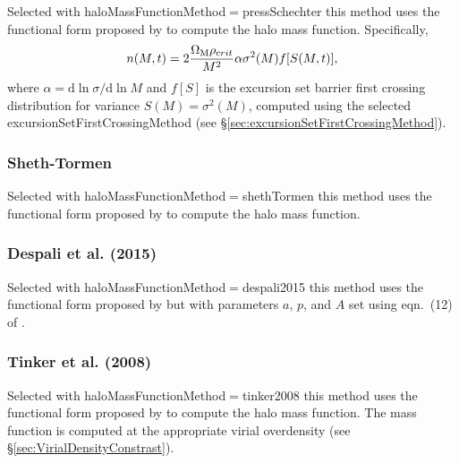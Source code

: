 Selected with {\normalfont \ttfamily haloMassFunctionMethod}$=${\normalfont \ttfamily pressSchechter} this method uses the functional form proposed by \cite{press_formation_1974} to compute the halo mass function. Specifically,
\begin{equation}
n(M,t) = 2 {\Omega_{\mathrm M} \rho_{\mathrm crit} \over M^2} \alpha \sigma^2(M) f[S(M,t)],
\end{equation}
where $\alpha = {\mathrm d}\ln\sigma/{\mathrm d}\ln M$ and $f[S]$ is the excursion set barrier first crossing distribution for variance $S(M)=\sigma^2(M)$, computed using the selected {\normalfont \ttfamily excursionSetFirstCrossingMethod} (see \S\ref{sec:excursionSetFirstCrossingMethod}).

\subsubsection{Sheth-Tormen}\label{phys:haloMassFunction:haloMassFunctionShethTormen}

Selected with {\normalfont \ttfamily haloMassFunctionMethod}$=${\normalfont \ttfamily shethTormen} this method uses the functional form proposed by \cite{sheth_ellipsoidal_2001} to compute the halo mass function.

\subsubsection{Despali et al. (2015)}\label{phys:haloMassFunction:haloMassFunctionDespali2015}

Selected with {\normalfont \ttfamily haloMassFunctionMethod}$=${\normalfont \ttfamily despali2015} this method uses the functional form proposed by \cite[][see \protect\S\ref{phys:haloMassFunction:haloMassFunctionShethTormen}]{sheth_ellipsoidal_2001} but with parameters $a$, $p$, and $A$ set using eqn.~(12) of \cite{despali_universality_2015}.

\subsubsection{Tinker et al. (2008)}\label{phys:haloMassFunction:haloMassFunctionTinker2008}

Selected with {\normalfont \ttfamily haloMassFunctionMethod}$=${\normalfont \ttfamily tinker2008} this method uses the functional form proposed by \cite{tinker_towardhalo_2008} to compute the halo mass function. The mass function is computed at the appropriate virial overdensity (see \S\ref{sec:VirialDensityConstrast}).

